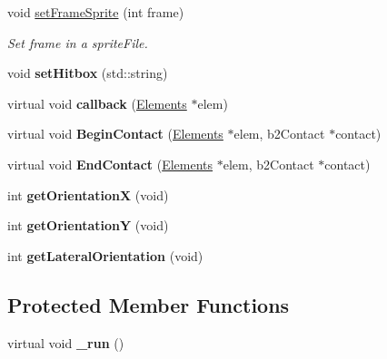 \begin{DoxyCompactItemize}
\item 
void \hyperlink{class_elements_a3bb4cc2e2009d0e447fbdd0212a57b73}{set\+Frame\+Sprite} (int frame)
\begin{DoxyCompactList}\small\item\em Set frame in a sprite\+File. \end{DoxyCompactList}\item 
\hypertarget{class_elements_ad7e4ecb2ecc2402cf892e60d8d803070}{void {\bfseries set\+Hitbox} (std\+::string)}\label{class_elements_ad7e4ecb2ecc2402cf892e60d8d803070}

\item 
\hypertarget{class_elements_a85bc66fe037551fcfa0b606cf32c4478}{virtual void {\bfseries callback} (\hyperlink{class_elements}{Elements} $\ast$elem)}\label{class_elements_a85bc66fe037551fcfa0b606cf32c4478}

\item 
\hypertarget{class_elements_a108938e08197adc349e98fb91abe1b5a}{virtual void {\bfseries Begin\+Contact} (\hyperlink{class_elements}{Elements} $\ast$elem, b2\+Contact $\ast$contact)}\label{class_elements_a108938e08197adc349e98fb91abe1b5a}

\item 
\hypertarget{class_elements_a42c3b694edefcc789109bd952a66d918}{virtual void {\bfseries End\+Contact} (\hyperlink{class_elements}{Elements} $\ast$elem, b2\+Contact $\ast$contact)}\label{class_elements_a42c3b694edefcc789109bd952a66d918}

\item 
\hypertarget{class_elements_a2dd2e1e757c9077755bbe309c504740b}{int {\bfseries get\+Orientation\+X} (void)}\label{class_elements_a2dd2e1e757c9077755bbe309c504740b}

\item 
\hypertarget{class_elements_a58d9facbd7f6264e8b4e2ff49f20d939}{int {\bfseries get\+Orientation\+Y} (void)}\label{class_elements_a58d9facbd7f6264e8b4e2ff49f20d939}

\item 
\hypertarget{class_elements_add4340c523571631da317d8a64fc1368}{int {\bfseries get\+Lateral\+Orientation} (void)}\label{class_elements_add4340c523571631da317d8a64fc1368}

\end{DoxyCompactItemize}
\subsection*{Protected Member Functions}
\begin{DoxyCompactItemize}
\item 
\hypertarget{class_elements_aa367c1471a9fc7f1a9b7b124e69c3ef3}{virtual void {\bfseries \+\_\+run} ()}\label{class_elements_aa367c1471a9fc7f1a9b7b124e69c3ef3}

\end{DoxyCompactItemize}
